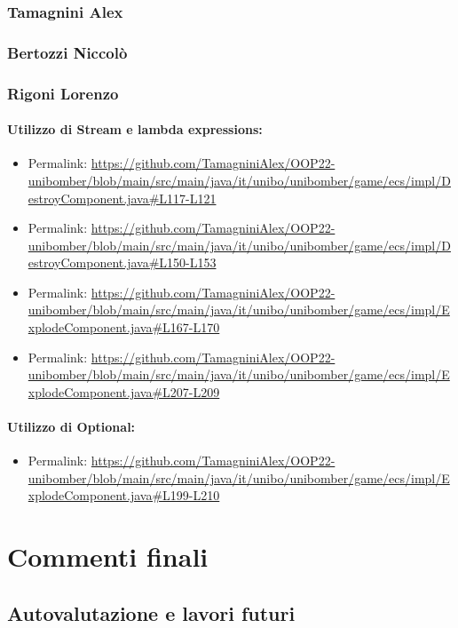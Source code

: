 \documentclass[a4paper,12pt]{report}
\begin{document}
\subsection*{Tamagnini Alex}

\subsection*{Bertozzi Niccolò}

\subsection*{Rigoni Lorenzo}
\subsubsection*{Utilizzo di Stream e lambda expressions:}
\begin{itemize}
    \item Permalink: \url{https://github.com/TamagniniAlex/OOP22-unibomber/blob/main/src/main/java/it/unibo/unibomber/game/ecs/impl/DestroyComponent.java#L117-L121}
    \item Permalink: \url{https://github.com/TamagniniAlex/OOP22-unibomber/blob/main/src/main/java/it/unibo/unibomber/game/ecs/impl/DestroyComponent.java#L150-L153}
    \item Permalink: \url{https://github.com/TamagniniAlex/OOP22-unibomber/blob/main/src/main/java/it/unibo/unibomber/game/ecs/impl/ExplodeComponent.java#L167-L170}
    \item Permalink: \url{https://github.com/TamagniniAlex/OOP22-unibomber/blob/main/src/main/java/it/unibo/unibomber/game/ecs/impl/ExplodeComponent.java#L207-L209}
\end{itemize}
\subsubsection*{Utilizzo di Optional:}
\begin{itemize}
    \item Permalink: \url{https://github.com/TamagniniAlex/OOP22-unibomber/blob/main/src/main/java/it/unibo/unibomber/game/ecs/impl/ExplodeComponent.java#L199-L210}
\end{itemize}

\chapter{Commenti finali}

\section{Autovalutazione e lavori futuri}
\end{document}
